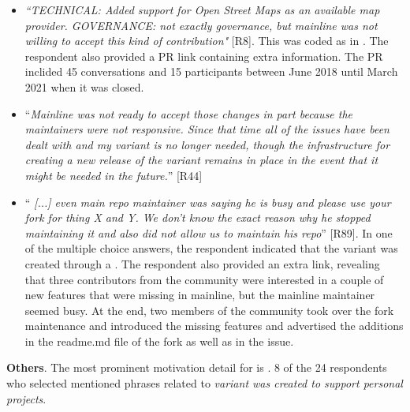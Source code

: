 \begin{itemize}[leftmargin=*]
\item \emph{``TECHNICAL: Added support for Open Street Maps as an available map provider. GOVERNANCE: not exactly governance, but mainline was not willing to accept this kind of contribution"} [R8]. This was coded as  in . The respondent also provided a \gh PR link containing extra information. The PR inclided 45 conversations and 15 participants between June 2018 until March 2021 when it was closed.

\item ``\emph{Mainline was not ready to accept those changes in part because the maintainers were not responsive. Since that time all of the issues have been dealt with and my variant is no longer needed, though the infrastructure for creating a new release of the variant remains in place in the event that it might be needed in the future.}'' [R44]

\item ``\emph{%
[...] even main repo maintainer was saying he is busy and please use your fork for thing X and Y. We don't know the exact reason why he stopped maintaining it and also did not allow us to maintain his repo}'' [R89]. In one of the multiple choice answers, the respondent indicated that the variant was created through a  .
The respondent also provided an extra link, revealing that
three contributors from the community were interested in a couple of new features that were missing in mainline, but the mainline maintainer seemed busy. At the end, two members of the community took over the fork maintenance and introduced the missing features and advertised the additions in the \textsf{readme.md} file of the fork as well as in the issue.

\end{itemize}


\nd \textbf{Others}. %
The most prominent motivation detail for  is  . 8 of the 24 respondents who selected  mentioned phrases related to \emph{variant was created to support personal projects}.


